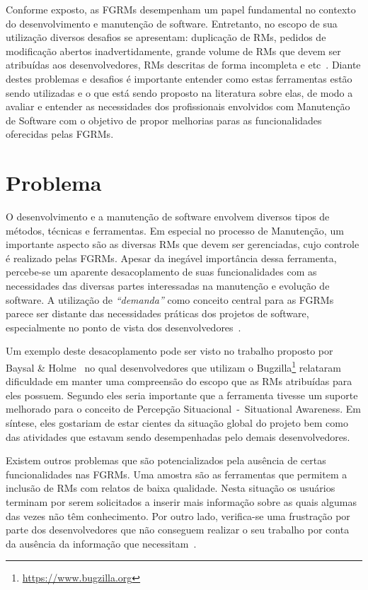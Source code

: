 Conforme exposto, as FGRMs desempenham um papel fundamental no contexto do
desenvolvimento e manutenção de software. Entretanto, no escopo de sua
utilização diversos desafios se apresentam: duplicação de RMs, pedidos de
modificação abertos inadvertidamente, grande volume de RMs que devem ser
atribuídas aos desenvolvedores, RMs descritas de forma incompleta e
etc~\cite{cavalcanti2014challenges}. Diante destes problemas e desafios é
importante entender como estas ferramentas estão sendo utilizadas e o que está
sendo proposto na literatura sobre elas, de modo a avaliar e entender as
necessidades dos profissionais envolvidos com Manutenção de Software com o
objetivo de propor melhorias paras as funcionalidades oferecidas pelas FGRMs.

\section{Problema}
\label{sec:intro-problema}

O desenvolvimento e a manutenção de software envolvem diversos tipos de métodos,
técnicas e ferramentas. Em especial no processo de Manutenção, um importante
aspecto são as diversas RMs que devem ser gerenciadas, cujo controle é realizado
pelas FGRMs. Apesar da inegável importância dessa ferramenta, percebe-se um
aparente desacoplamento de suas funcionalidades com as necessidades das diversas
partes interessadas na manutenção e evolução de software. A utilização de
\textit{``demanda''} como conceito central para as FGRMs parece ser distante das
necessidades práticas dos projetos de software, especialmente no ponto de vista
dos desenvolvedores~\cite{Baysal:2013:SAP:2486788.2486957}.

Um exemplo deste desacoplamento pode ser visto no trabalho proposto por Baysal
\& Holme~\cite{baysal2012qualitative} no qual desenvolvedores que utilizam o
Bugzilla\footnote{\url{https://www.bugzilla.org}} relataram dificuldade em
manter uma compreensão do escopo que as RMs atribuídas para eles possuem.
Segundo eles seria importante que a ferramenta tivesse um suporte melhorado
para o conceito de Percepção Situacional~-~Situational Awareness. Em síntese,
eles gostariam de estar cientes da situação global do projeto bem como das
atividades que estavam sendo desempenhadas pelo demais desenvolvedores.

Existem outros problemas que são potencializados pela ausência de certas
funcionalidades nas FGRMs. Uma amostra são as ferramentas que permitem a
inclusão de RMs com relatos de baixa qualidade. Nesta situação os usuários
terminam por serem solicitados a inserir mais informação sobre as quais algumas
das vezes não têm conhecimento. Por outro lado, verifica-se uma frustração por
parte dos desenvolvedores que não conseguem realizar o seu trabalho por conta
da ausência da informação que necessitam~\cite{just2008towards}.

